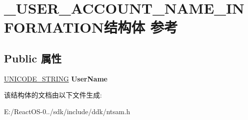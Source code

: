\hypertarget{struct___u_s_e_r___a_c_c_o_u_n_t___n_a_m_e___i_n_f_o_r_m_a_t_i_o_n}{}\section{\+\_\+\+U\+S\+E\+R\+\_\+\+A\+C\+C\+O\+U\+N\+T\+\_\+\+N\+A\+M\+E\+\_\+\+I\+N\+F\+O\+R\+M\+A\+T\+I\+O\+N结构体 参考}
\label{struct___u_s_e_r___a_c_c_o_u_n_t___n_a_m_e___i_n_f_o_r_m_a_t_i_o_n}
\subsection*{Public 属性}
\begin{DoxyCompactItemize}
\item 
\mbox{\label{struct___u_s_e_r___a_c_c_o_u_n_t___n_a_m_e___i_n_f_o_r_m_a_t_i_o_n_a755b9dcbb7bac6c72a719f374d476635}} 
\hyperlink{struct___u_n_i_c_o_d_e___s_t_r_i_n_g}{U\+N\+I\+C\+O\+D\+E\+\_\+\+S\+T\+R\+I\+NG} {\bfseries User\+Name}
\end{DoxyCompactItemize}


该结构体的文档由以下文件生成\+:\begin{DoxyCompactItemize}
\item 
E\+:/\+React\+O\+S-\/0../sdk/include/ddk/ntsam.\+h\end{DoxyCompactItemize}
